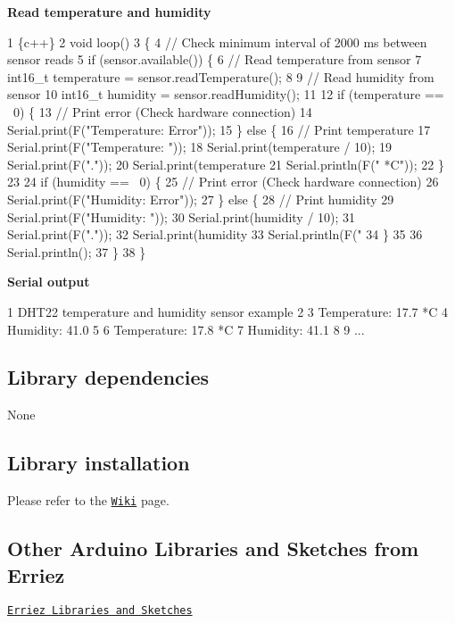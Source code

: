 {\bfseries Read temperature and humidity}


\begin{DoxyCode}
1 \{c++\}
2 void loop()
3 \{
4     // Check minimum interval of 2000 ms between sensor reads
5     if (sensor.available()) \{
6         // Read temperature from sensor
7         int16\_t temperature = sensor.readTemperature();
8 
9         // Read humidity from sensor
10         int16\_t humidity = sensor.readHumidity();
11 
12         if (temperature == ~0) \{
13             // Print error (Check hardware connection)
14             Serial.print(F("Temperature: Error"));
15         \} else \{
16             // Print temperature
17             Serial.print(F("Temperature: "));
18             Serial.print(temperature / 10);
19             Serial.print(F("."));
20             Serial.print(temperature %
21             Serial.println(F(" *C"));
22         \}
23 
24         if (humidity == ~0) \{
25             // Print error (Check hardware connection)
26             Serial.print(F("Humidity: Error"));
27         \} else \{
28             // Print humidity
29             Serial.print(F("Humidity: "));
30             Serial.print(humidity / 10);
31             Serial.print(F("."));
32             Serial.print(humidity %
33             Serial.println(F(" %
34         \}
35 
36         Serial.println();
37       \}
38 \}
\end{DoxyCode}


{\bfseries Serial output}


\begin{DoxyCode}
1 DHT22 temperature and humidity sensor example
2 
3 Temperature: 17.7 *C
4 Humidity: 41.0 %
5 
6 Temperature: 17.8 *C
7 Humidity: 41.1 %
8 
9 ...
\end{DoxyCode}


\subsection*{Library dependencies}


\begin{DoxyItemize}
\item None
\end{DoxyItemize}

\subsection*{Library installation}

Please refer to the \href{https://github.com/Erriez/ErriezArduinoLibrariesAndSketches/wiki}{\tt Wiki} page.

\subsection*{Other Arduino Libraries and Sketches from Erriez}


\begin{DoxyItemize}
\item \href{https://github.com/Erriez/ErriezArduinoLibrariesAndSketches}{\tt Erriez Libraries and Sketches} 
\end{DoxyItemize}